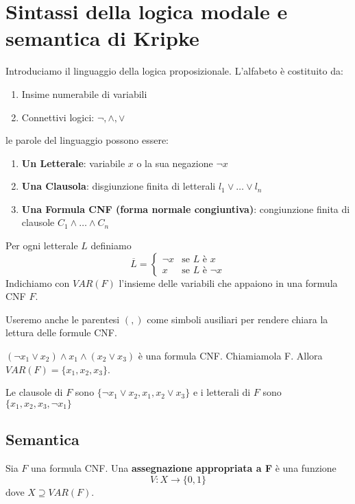 \documentclass[10pt,a4paper,twoside]{book}
\begin{document}
\section{Sintassi della logica modale e semantica di Kripke}
Introduciamo il linguaggio della logica proposizionale. L'alfabeto è costituito da:
\begin{enumerate}
    \item Insime numerabile di variabili
    \item Connettivi logici: $\neg, \land, \lor$
\end{enumerate}
le parole del linguaggio possono essere:
\begin{enumerate}
    \item \textbf{Un Letterale}: variabile $x$ o la sua negazione $\neg x$
    \item \textbf{Una Clausola}: disgiunzione finita di letterali $l_1 \lor \ldots \lor l_n$
    \item \textbf{Una Formula CNF (forma normale congiuntiva)}: congiunzione finita di clausole $C_1 \land \ldots \land C_n$
\end{enumerate}
Per ogni letterale $L$ definiamo
\begin{equation*}
    \overline{L} = \begin{cases}
        \neg x & \text{se } L \text{ è } x      \\
        x      & \text{se } L \text{ è } \neg x
    \end{cases}
\end{equation*}
Indichiamo con $VAR(F)$ l'insieme delle variabili che appaiono in una formula CNF $F$.

Useremo anche le parentesi $(,)$ come simboli ausiliari per rendere chiara la lettura delle formule CNF.
\begin{example}
    $(\neg x_1 \lor x_2) \land x_1 \land (x_2 \lor x_3)$ è una formula CNF. Chiamiamola F. Allora $VAR(F)=\{x_1,x_2,x_3\}$.

    Le clausole di $F$ sono $\{\neg x_1 \lor x_2, x_1, x_2 \lor x_3\}$ e i letterali di $F$ sono $\{x_1, x_2, x_3, \neg x_1 \}$
\end{example}

\subsection{Semantica}
\begin{definition}
    Sia $F$ una formula CNF. Una \textbf{assegnazione appropriata a F} è una funzione
    \begin{equation*}
        V: X \rightarrow \{0,1\}
    \end{equation*}
    dove $X \supseteq VAR(F)$.
\end{definition}
\end{document}
